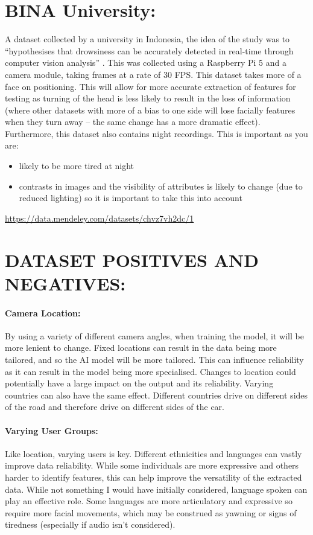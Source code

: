 \section{BINA University:}
A dataset collected by a university in Indonesia, the idea of the study was to “hypothesises that drowsiness can be accurately detected
in real-time through computer vision analysis” \cite{BINA}. This was collected using a Raspberry Pi 5 and a camera module, taking frames at a
rate of 30 FPS. This dataset takes more of a face on positioning. This will allow for more accurate extraction of features for testing
as turning of the head is less likely to result in the loss of information (where other datasets with more of a bias to one side will
lose facially features when they turn away – the same change has a more dramatic effect). Furthermore, this dataset also contains
night recordings. This is important as you are:
\begin{itemize}
    \item likely to be more tired at night
    \item contrasts in images and the visibility of attributes is likely to change (due to reduced lighting) so it is important to take this into account
\end{itemize}
\url{ https://data.mendeley.com/datasets/chvz7vh2dc/1} \cite{BINA}

\section{DATASET POSITIVES AND NEGATIVES:}
\paragraph{Camera Location:}
By using a variety of different camera angles, when training the model, it will be more lenient to change. Fixed locations can result in
the data being more tailored, and so the AI model will be more tailored. This can influence reliability as it can result in the model
being more specialised. Changes to location could potentially have a large impact on the output and its reliability. Varying countries
can also have the same effect. Different countries drive on different sides of the road and therefore drive on different sides of the car.
\paragraph{Varying User Groups:}
Like location, varying users is key. Different ethnicities and languages can vastly improve data reliability. While some individuals are
more expressive and others harder to identify features, this can help improve the versatility of the extracted data. While not something
I would have initially considered, language spoken can play an effective role. Some languages are more articulatory and expressive so
require more facial movements, which may be construed as yawning or signs of tiredness (especially if audio isn’t considered).

